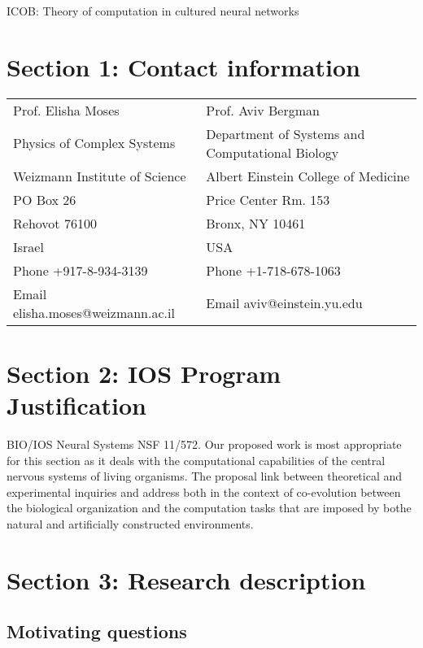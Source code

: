 \begin{center}
ICOB: Theory of computation in cultured neural networks
\end{center}
\section{Section 1: Contact information}
\begin{tabular}{ l l }
Prof. Elisha Moses & Prof. Aviv Bergman\\
Physics of Complex Systems & Department of Systems and Computational Biology\\
Weizmann Institute of Science & Albert Einstein College of Medicine\\
PO Box 26 & Price Center Rm. 153\\
Rehovot 76100 & Bronx, NY 10461\\
Israel & USA\\
Phone +917-8-934-3139 & Phone +1-718-678-1063\\
Email elisha.moses@weizmann.ac.il & Email aviv@einstein.yu.edu\\
\end{tabular}

\section{Section 2: IOS Program Justification}
BIO/IOS Neural Systems NSF 11/572.
Our proposed work is most appropriate for this section as it deals with the computational capabilities of the central nervous systems of living organisms. The proposal link between theoretical and experimental inquiries and address both in the context of co-evolution between the biological organization and the computation tasks that are imposed by bothe natural and artificially constructed environments.

\section{Section 3: Research description}
\subsection{Motivating questions}

